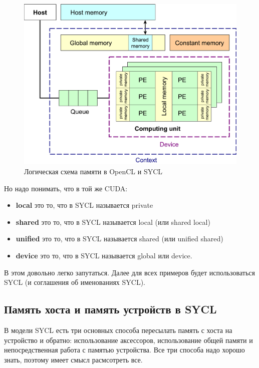 \documentclass[a4paper,12pt,oneside]{article}
\begin{document}
\begin{figure}
\centering
\includegraphics[width=1.0\textwidth]{pictures/logical-memory.pdf}
\caption{Логическая схема памяти в OpenCL и SYCL}
\label{fig:logicalmemory}
\end{figure}

Но надо понимать, что в той же CUDA:
\begin{itemize}
\item \textbf{local} это то, что в SYCL называется private
\item \textbf{shared} это то, что в SYCL называется local (или shared local)
\item \textbf{unified} это то, что в SYCL называется shared (или unified shared)
\item \textbf{device} это то, что в SYCL называется global или device.
\end{itemize}

В этом довольно легко запутаться. Далее для всех примеров будет использоваться SYCL (и соглашения об именованиях SYCL).

\subsection{Память хоста и память устройств в SYCL}\label{subsec:memsend}

В модели SYCL есть три основных способа пересылать память с хоста на устройство и обратно: использование аксессоров, использование общей памяти и непосредственная работа с памятью устройства.
Все три способа надо хорошо знать, поэтому имеет смысл расмсотреть все.
\end{document}

